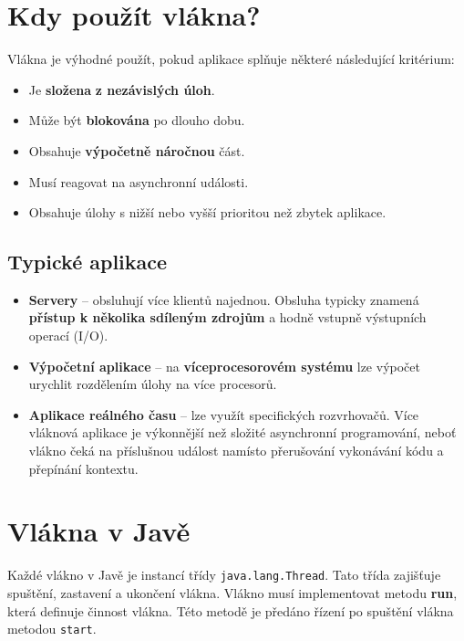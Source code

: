 \section{Kdy použít vlákna?}
Vlákna je výhodné použít, pokud aplikace splňuje některé následující kritérium:
\begin{itemize}
    \item Je \textbf{složena}\textbf{ z nezávislých úloh}.
    \item Může být \textbf{blokována} po dlouho dobu.
    \item Obsahuje \textbf{výpočetně náročnou} část.
    \item Musí reagovat na asynchronní události.
    \item Obsahuje úlohy s nižší nebo vyšší prioritou než zbytek aplikace.
\end{itemize}

\subsection{Typické aplikace}
\begin{itemize}
    \item \textbf{Servery} -- obsluhují více klientů najednou. Obsluha typicky znamená \textbf{přístup k několika sdíleným zdrojům} a hodně vstupně výstupních operací (I/O).
    \item \textbf{Výpočetní aplikace} -- na \textbf{víceprocesorovém systému} lze výpočet urychlit rozdělením úlohy na více procesorů.
    \item \textbf{Aplikace reálného času} -- lze využít specifických rozvrhovačů. Více vláknová aplikace je výkonnější než složité asynchronní programování, neboť vlákno čeká na příslušnou událost namísto přerušování vykonávání kódu a přepínání kontextu.
\end{itemize}

\section{Vlákna v Javě}
Každé vlákno v Javě je instancí třídy \texttt{java.lang.Thread}. Tato třída zajišťuje spuštění, zastavení a ukončení vlákna. Vlákno musí implementovat metodu \textbf{run}, která definuje činnost vlákna. Této metodě je předáno řízení po spuštění vlákna metodou \texttt{start}.

